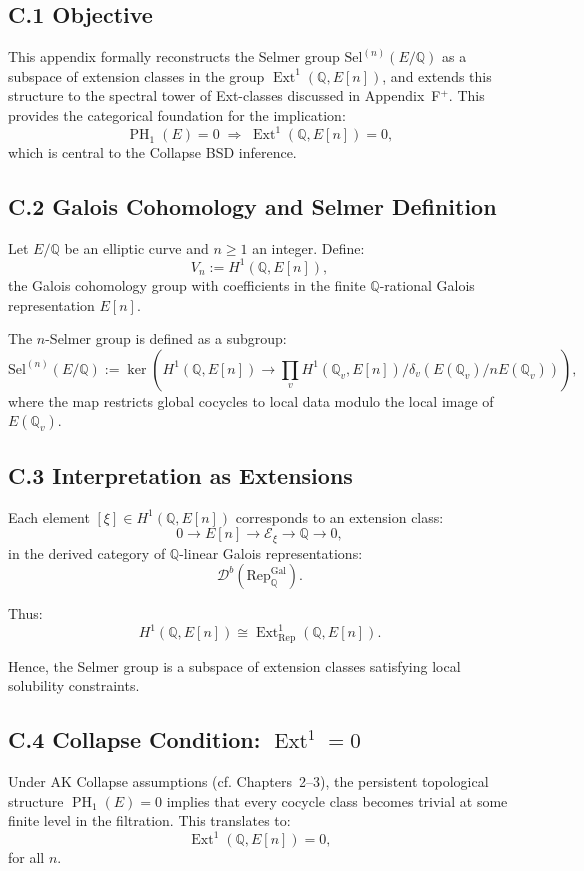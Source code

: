 \documentclass[11pt]{article}
\DeclareMathOperator{\Ext}{Ext}
\DeclareMathOperator{\PH}{PH}
\newcommand{\QQ}{\mathbb{Q}}
\begin{document}
\subsection*{C.1 Objective}

This appendix formally reconstructs the Selmer group $\mathrm{Sel}^{(n)}(E/\QQ)$ as a subspace of extension classes in the group $\Ext^1(\QQ,E[n])$, and extends this structure to the spectral tower of Ext-classes discussed in Appendix~F$^+$. This provides the categorical foundation for the implication:
\[
\PH_1(E) = 0 \;\Rightarrow\; \Ext^1(\QQ,E[n]) = 0,
\]
which is central to the Collapse BSD inference.

\subsection*{C.2 Galois Cohomology and Selmer Definition}

Let $E/\QQ$ be an elliptic curve and $n \geq 1$ an integer.  Define:
\[
V_n := H^1(\QQ,E[n]),
\]
the Galois cohomology group with coefficients in the finite $\QQ$-rational Galois representation $E[n]$.

The $n$-Selmer group is defined as a subgroup:
\[
\mathrm{Sel}^{(n)}(E/\QQ) := \ker \left( H^1(\QQ, E[n]) \to \prod_v H^1(\QQ_v, E[n]) / \delta_v(E(\QQ_v)/nE(\QQ_v)) \right),
\]
where the map restricts global cocycles to local data modulo the local image of $E(\QQ_v)$.

\subsection*{C.3 Interpretation as Extensions}

Each element $[\xi] \in H^1(\QQ,E[n])$ corresponds to an extension class:
\[
0 \to E[n] \to \mathcal{E}_\xi \to \QQ \to 0,
\]
in the derived category of $\QQ$-linear Galois representations:
\[
\mathcal{D}^b(\mathrm{Rep}_{\QQ}^{\text{Gal}}).
\]

Thus:
\[
H^1(\QQ,E[n]) \cong \Ext^1_{\mathrm{Rep}}(\QQ, E[n]).
\]

Hence, the Selmer group is a subspace of extension classes satisfying local solubility constraints.

\subsection*{C.4 Collapse Condition: $\Ext^1 = 0$}

Under AK Collapse assumptions (cf. Chapters~2--3), the persistent topological structure $\PH_1(E)=0$ implies that every cocycle class becomes trivial at some finite level in the filtration. This translates to:
\[
\Ext^1(\QQ,E[n]) = 0,
\]
for all $n$.
\end{document}
